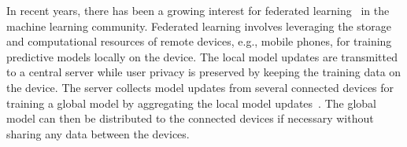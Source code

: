 In recent years, there has been a growing interest for federated learning~\cite{konevcny2015federated, mcmahan2017communication, li2020federated} in the machine learning community. 
Federated learning involves leveraging the storage and computational resources of remote devices, e.g., mobile phones, for training predictive models locally on the device. The local model updates are transmitted to a central server while user privacy is preserved by keeping the training data on the device. The server collects model updates from several connected devices for training a global model by aggregating the local model updates~\cite{mcmahan2017communication}. The global model can then be distributed to the connected devices if necessary without sharing any data between the devices. 

\vspace{-3mm}
